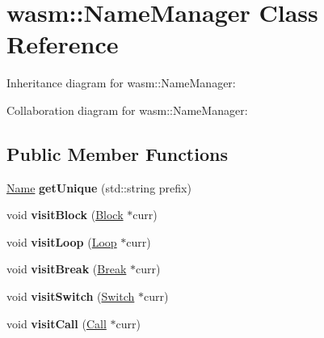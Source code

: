 \hypertarget{classwasm_1_1_name_manager}{}\section{wasm\+:\+:Name\+Manager Class Reference}
\label{classwasm_1_1_name_manager}


Inheritance diagram for wasm\+:\+:Name\+Manager\+:


Collaboration diagram for wasm\+:\+:Name\+Manager\+:
\subsection*{Public Member Functions}
\begin{DoxyCompactItemize}
\item 
\mbox{\label{classwasm_1_1_name_manager_a932b59a2759f049b352cfe861e9c78b1}} 
\mbox{\hyperlink{structwasm_1_1_name}{Name}} {\bfseries get\+Unique} (std\+::string prefix)
\item 
\mbox{\label{classwasm_1_1_name_manager_a0cf67fbac620e536baaab43ab8acf939}} 
void {\bfseries visit\+Block} (\mbox{\hyperlink{classwasm_1_1_block}{Block}} $\ast$curr)
\item 
\mbox{\label{classwasm_1_1_name_manager_a3f9a51d14c02e8270c5d5cc56c3930b4}} 
void {\bfseries visit\+Loop} (\mbox{\hyperlink{classwasm_1_1_loop}{Loop}} $\ast$curr)
\item 
\mbox{\label{classwasm_1_1_name_manager_af2ab6482214a8b0dd7a4375852b7b2dd}} 
void {\bfseries visit\+Break} (\mbox{\hyperlink{classwasm_1_1_break}{Break}} $\ast$curr)
\item 
\mbox{\label{classwasm_1_1_name_manager_a65eedffe6d7f1a615dcd5d9a139f48d8}} 
void {\bfseries visit\+Switch} (\mbox{\hyperlink{classwasm_1_1_switch}{Switch}} $\ast$curr)
\item 
\mbox{\label{classwasm_1_1_name_manager_ac91a32dbfd7504c92a318ce49608ecf1}} 
void {\bfseries visit\+Call} (\mbox{\hyperlink{classwasm_1_1_call}{Call}} $\ast$curr)
\item 
\mbox{\label{classwasm_1_1_name_manager_a2e7d57d50105156b60cc63741d65808f}} 

\end{DoxyCompactItemize}
